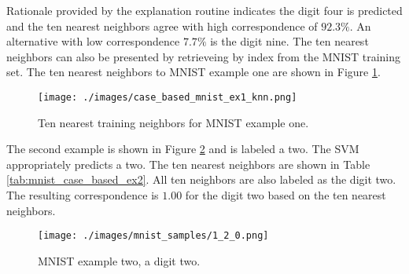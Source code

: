 Rationale provided by the explanation routine indicates the digit four is
predicted and the ten nearest neighbors agree with high correspondence of
$92.3\%$. An alternative with low correspondence $7.7\%$ is the digit nine. The
ten nearest neighbors can also be presented by retrieveing by index from the
MNIST training set.  The ten nearest neighbors to MNIST example one are shown in
Figure \ref{fig:mnist_case_based_ex1_knn}.

\begin{figure}[H]
    \centerline{\texttt{[image: ./images/case\_based\_mnist\_ex1\_knn.png]}}
    \caption{Ten nearest training neighbors for MNIST example one.}
    \label{fig:mnist_case_based_ex1_knn}
\end{figure}



The second example is shown in Figure \ref{fig:mnist_case_based_example2} and is
labeled a two. The SVM appropriately predicts a two.  The ten nearest neighbors
are shown in Table \ref{tab:mnist_case_based_ex2}.  All ten neighbors are also
labeled as the digit two.  The resulting correspondence is $1.00$ for the digit
two based on the ten nearest neighbors.

\begin{figure}[H]
    \centerline{\texttt{[image: ./images/mnist\_samples/1\_2\_0.png]}}
    \caption{MNIST example two, a digit two.}
    \label{fig:mnist_case_based_example2}
\end{figure}

